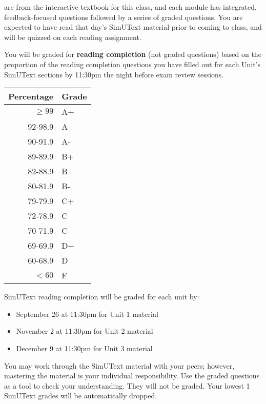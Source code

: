 \documentclass{tufte-handout}
\begin{document}
 are from the interactive textbook for this class, and each module has integrated, feedback-focused questions followed by a series of graded questions. \color{blue}You are expected to have read that day's SimUText material prior to coming to class, and will be quizzed on each reading assignment. \color{black} 

You will be graded for \textbf{reading completion} (not graded questions) based on the proportion of the reading completion questions you have filled out for each Unit's SimUText sections by 11:30pm the night before exam review sessions.



\begin{margintable}
\begin{tabular}{rl}
Percentage & Grade \\
\hline 
$\ge99$ & A+ \\
92-98.9 & A \\
90-91.9 & A- \\
89-89.9 & B+ \\
82-88.9 & B \\
80-81.9 & B- \\
79-79.9 & C+ \\
72-78.9 & C \\
70-71.9 & C- \\
69-69.9 & D+ \\
60-68.9 & D \\
$<60$ & F \\
\hline
\end{tabular}
\end{margintable}

SimUText reading completion will be graded for each unit by:
\begin{itemize}
\item September 26 at 11:30pm for Unit 1 material
\item November 2 at 11:30pm for Unit 2 material 
\item December 9 at 11:30pm for Unit 3 material 
\end{itemize}


You may work through the SimUText material with your peers; however, mastering the material is your individual responsibility. Use the graded questions as a tool to check your understanding. They will not be graded. Your lowest 1 SimUText grades will be automatically dropped.
\end{document}
